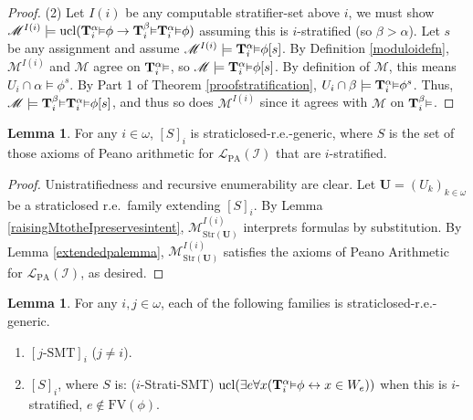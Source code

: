 \documentclass[reqno]{article}
\theoremstyle{definition}
\newtheorem{lemma}[theorem]{Lemma}
\def\L{\mathscr{L}}
\def\M{\mathscr{M}}
\def\T{\mathbf{T}}
\def\U{\mathbf{U}}
\def\FV{\mathrm{FV}}
\def\LPA{\L_{\mathrm{PA}}}
\def\indset{\mathcal I}
\newcommand{\Prr}[2]{\T^{#1}_{#2}\mbox{\small${\vDash}$}}
\newcommand{\ucl}[1]{\mathrm{ucl}(#1)}
\newcommand{\str}[1]{\mathrm{Str}(#1)} \newcommand{\Str}[1]{\str{#1}}
\begin{document}
\begin{proof}
\item
(2)
Let $I(i)$ be any computable stratifier-set above $i$,
we must show $\M^{I(i)}\models
\ucl{\Prr\alpha i\phi\rightarrow\Prr\beta i\Prr\alpha i\phi}$
assuming this is $i$-stratified (so $\beta>\alpha$).
Let $s$ be any assignment and assume $\M^{I(i)}\models\Prr\alpha i\phi[s]$.
By Definition \ref{moduloidefn}, $\M^{I(i)}$ and $\M$ agree on $\Prr\alpha i$,
so $\M\models\Prr\alpha i\phi[s]$.
By definition of $\M$, this means $U_i\cap\alpha\models \phi^s$.
By Part 1 of Theorem \ref{proofstratification},
$U_i\cap\beta\models \Prr\alpha i\phi^s$.
Thus, $\M\models \Prr\beta i\Prr\alpha i\phi[s]$,
and thus so does $\M^{I(i)}$ since it agrees with $\M$ on $\Prr\beta i$.
\end{proof}

\begin{lemma}
\label{secondutilbagarithmetic}
For any $i\in\omega$, $[S]_i$ is straticlosed-r.e.-generic,
where $S$ is the set of those axioms of Peano arithmetic for
$\LPA(\indset)$ that are $i$-stratified.
\end{lemma}

\begin{proof}
Unistratifiedness and recursive enumerability are clear.
Let $\U=(U_k)_{k\in\omega}$ be a straticlosed r.e.~family
extending $[S]_i$.
By Lemma \ref{raisingMtotheIpreservesintent}, $\M^{I(i)}_{\str\U}$ interprets formulas
by substitution. By Lemma \ref{extendedpalemma}, $\M^{I(i)}_{\str\U}$ satisfies the axioms
of Peano Arithmetic for $\LPA(\indset)$, as desired.
\end{proof}

\begin{lemma}
\label{secondutilbagsmt}
For any $i,j\in\omega$, each of the following families is straticlosed-r.e.-generic.
\begin{enumerate}
\item $[\mbox{$j$-SMT}]_i$ ($j\not=i$).
\item $[S]_i$, where $S$ is: ($i$-Strati-SMT)
$\ucl{\exists e\forall x(\Prr\alpha i\phi\leftrightarrow x\in W_e)}$
when this is $i$-stratified, $e\not\in\FV(\phi)$.
\end{enumerate}
\end{lemma}
\end{document}
